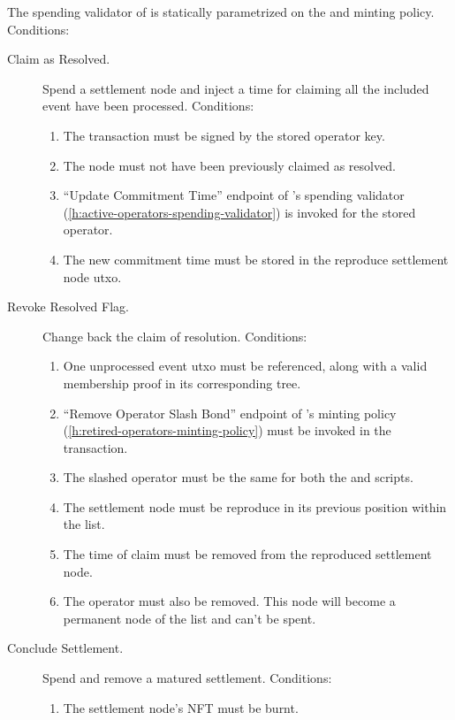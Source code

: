 \documentclass[../midgard.tex]{subfiles}
\begin{document}
The spending validator of  is statically parametrized on the  and  minting policy.
Conditions:
\begin{description}
    \item[Claim as Resolved.] Spend a settlement node and inject a time for claiming all the included event have been processed.
      Conditions:
        \begin{enumerate}
            \item The transaction must be signed by the stored operator key.
            \item The node must not have been previously claimed as resolved.
            \item ``Update Commitment Time'' endpoint of 's spending validator (\ref{h:active-operators-spending-validator}) is invoked for the stored operator.
            \item The new commitment time must be stored in the reproduce settlement node utxo.
        \end{enumerate}
    \item[Revoke Resolved Flag.] Change back the claim of resolution.
      Conditions:
        \begin{enumerate}
            \item One unprocessed event utxo must be referenced, along with a valid membership proof in its corresponding tree.
            \item ``Remove Operator Slash Bond'' endpoint of 's minting policy (\ref{h:retired-operators-minting-policy}) must be invoked in the transaction.
            \item The slashed operator must be the same for both the  and  scripts.
            \item The settlement node must be reproduce in its previous position within the  list.
            \item The time of claim must be removed from the reproduced settlement node.
            \item The operator must also be removed. This node will become a permanent node of the  list and can't be spent.
        \end{enumerate}
    \item[Conclude Settlement.] Spend and remove a matured settlement.
      Conditions:
        \begin{enumerate}
            \item The settlement node's NFT must be burnt.
        \end{enumerate}
\end{description}
\end{document}
